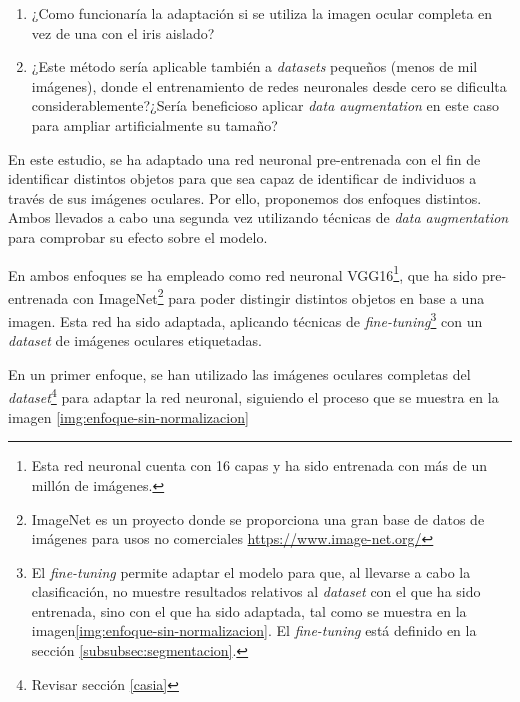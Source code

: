 \begin{enumerate}
    \item ¿Como funcionaría la adaptación si se utiliza la imagen ocular completa en vez de una con el iris aislado?
    \item ¿Este método sería aplicable también a \textit{datasets} pequeños (menos de mil imágenes), donde el entrenamiento de redes neuronales desde cero se dificulta considerablemente?¿Sería beneficioso aplicar \textit{data augmentation} en este caso para ampliar artificialmente su tamaño?
\end{enumerate}


En este estudio, se ha adaptado una red neuronal pre-entrenada con el fin de identificar distintos objetos para que sea capaz de identificar de individuos a través de sus imágenes oculares. Por ello, proponemos dos enfoques distintos. Ambos llevados a cabo una segunda vez utilizando técnicas de \textit{data augmentation} para comprobar su efecto sobre el modelo.

En ambos enfoques se ha empleado como red neuronal VGG16\footnote{Esta red neuronal cuenta con 16 capas y ha sido entrenada con más de un millón de imágenes.}, que ha sido pre-entrenada con ImageNet\footnote{ImageNet es un proyecto donde se proporciona 
una gran base de datos de imágenes para usos no comerciales \url{https://www.image-net.org/}} para poder distingir distintos objetos en base a una imagen. Esta red ha sido adaptada, aplicando técnicas de \textit{fine-tuning}\footnote{El \textit{fine-tuning} 
permite adaptar el modelo para que, al llevarse a cabo la clasificación, no muestre resultados relativos al \textit{dataset} con el que ha sido entrenada, sino con el que ha sido adaptada, tal como se muestra en la imagen\ref{img:enfoque-sin-normalizacion}. El \textit{fine-tuning} está definido en la sección \ref{subsubsec:segmentacion}.}
 con un \textit{dataset} de imágenes oculares etiquetadas.

En un primer enfoque, se han utilizado las imágenes oculares completas del \textit{dataset}\footnote{Revisar sección \ref{casia}} para adaptar la red neuronal, siguiendo el proceso que se muestra en la imagen \ref{img:enfoque-sin-normalizacion}



